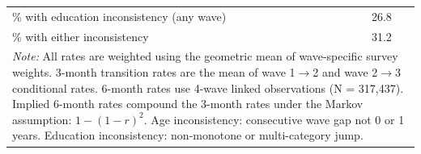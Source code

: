 \begin{table}[htbp]
\begin{tabular}{lc}
\% with education inconsistency (any wave) & 26.8 \\
\% with either inconsistency & 31.2 \\
\bottomrule
\multicolumn{2}{p{0.85\textwidth}}{\footnotesize \textit{Note:} All rates are weighted using the geometric mean of wave-specific survey weights. 3-month transition rates are the mean of wave 1$\to$2 and wave 2$\to$3 conditional rates. 6-month rates use 4-wave linked observations (N = 317,437). Implied 6-month rates compound the 3-month rates under the Markov assumption: $1 - (1-r)^2$. Age inconsistency: consecutive wave gap not 0 or 1 years. Education inconsistency: non-monotone or multi-category jump.} \\
\end{tabular}
\end{table}
